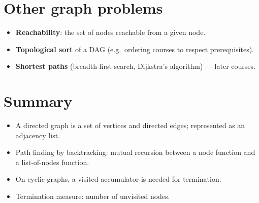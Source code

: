 \section{Other graph problems}
\begin{itemize}
  \item \textbf{Reachability}: the set of nodes reachable from a given node.
  \item \textbf{Topological sort} of a DAG (e.g.\ ordering courses to respect prerequisites).
  \item \textbf{Shortest paths} (breadth-first search, Dijkstra's algorithm) --- later courses.
\end{itemize}

\section{Summary}
\begin{itemize}
  \item A directed graph is a set of vertices and directed edges; represented as an adjacency list.
  \item Path finding by backtracking: mutual recursion between a node function and a list-of-nodes function.
  \item On cyclic graphs, a visited accumulator is needed for termination.
  \item Termination measure: number of unvisited nodes.
\end{itemize}
